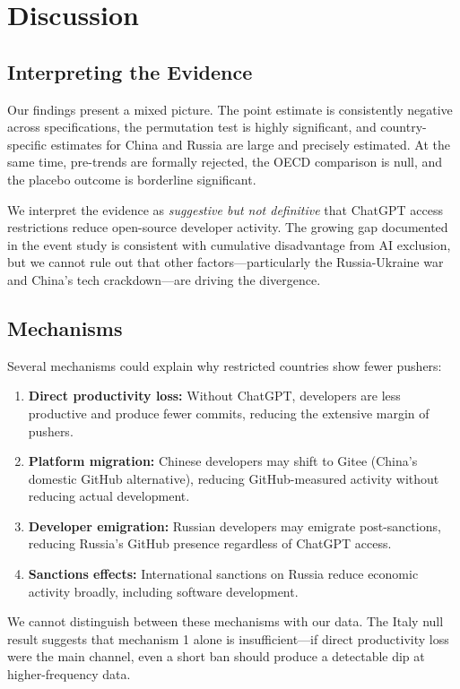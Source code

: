 \documentclass[12pt]{article}
\begin{document}
\section{Discussion}

\subsection{Interpreting the Evidence}

Our findings present a mixed picture. The point estimate is consistently negative across specifications, the permutation test is highly significant, and country-specific estimates for China and Russia are large and precisely estimated. At the same time, pre-trends are formally rejected, the OECD comparison is null, and the placebo outcome is borderline significant.

We interpret the evidence as \textit{suggestive but not definitive} that ChatGPT access restrictions reduce open-source developer activity. The growing gap documented in the event study is consistent with cumulative disadvantage from AI exclusion, but we cannot rule out that other factors---particularly the Russia-Ukraine war and China's tech crackdown---are driving the divergence.

\subsection{Mechanisms}

Several mechanisms could explain why restricted countries show fewer pushers:

\begin{enumerate}
    \item \textbf{Direct productivity loss:} Without ChatGPT, developers are less productive and produce fewer commits, reducing the extensive margin of pushers.
    \item \textbf{Platform migration:} Chinese developers may shift to Gitee (China's domestic GitHub alternative), reducing GitHub-measured activity without reducing actual development.
    \item \textbf{Developer emigration:} Russian developers may emigrate post-sanctions, reducing Russia's GitHub presence regardless of ChatGPT access.
    \item \textbf{Sanctions effects:} International sanctions on Russia reduce economic activity broadly, including software development.
\end{enumerate}

We cannot distinguish between these mechanisms with our data. The Italy null result suggests that mechanism 1 alone is insufficient---if direct productivity loss were the main channel, even a short ban should produce a detectable dip at higher-frequency data.
\end{document}
